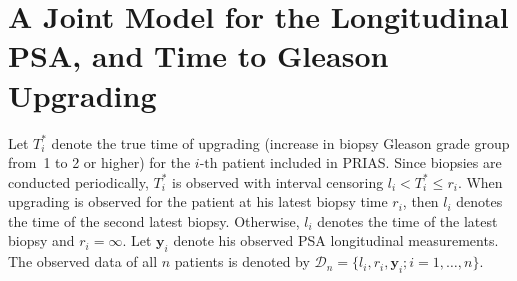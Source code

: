\section{A Joint Model for the Longitudinal PSA, and Time to Gleason Upgrading}
\label{sec:jm_framework}

Let $T_i^*$ denote the true time of upgrading (increase in biopsy Gleason grade group from~1 to 2 or higher) for the ${i\mbox{-th}}$ patient included in PRIAS. Since biopsies are conducted periodically, $T_i^*$ is observed with interval censoring ${l_i < T_i^* \leq r_i}$. When upgrading is observed for the patient at his latest biopsy time $r_i$, then $l_i$ denotes the time of the second latest biopsy. Otherwise, $l_i$ denotes the time of the latest biopsy and ${r_i=\infty}$. Let $\boldsymbol{y}_{i}$ denote his observed PSA longitudinal measurements. The observed data of all $n$ patients is denoted by ${\mathcal{D}_n = \{l_i, r_i, \boldsymbol{y}_{i}; i = 1, \ldots, n\}}$.

